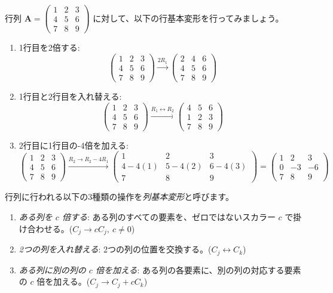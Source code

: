 \begin{ex}
行列 $\bm{A} = \begin{pmatrix} 1 & 2 & 3 \\ 4 & 5 & 6 \\ 7 & 8 & 9 \end{pmatrix}$ に対して、以下の行基本変形を行ってみましょう。
\begin{enumerate}
    \item 1行目を2倍する:
    \[ \begin{pmatrix} 1 & 2 & 3 \\ 4 & 5 & 6 \\ 7 & 8 & 9 \end{pmatrix} \xrightarrow{2R_1} \begin{pmatrix} 2 & 4 & 6 \\ 4 & 5 & 6 \\ 7 & 8 & 9 \end{pmatrix} \]
    \item 1行目と2行目を入れ替える:
    \[ \begin{pmatrix} 1 & 2 & 3 \\ 4 & 5 & 6 \\ 7 & 8 & 9 \end{pmatrix} \xrightarrow{R_1 \leftrightarrow R_2} \begin{pmatrix} 4 & 5 & 6 \\ 1 & 2 & 3 \\ 7 & 8 & 9 \end{pmatrix} \]
    \item 2行目に1行目の-4倍を加える:
    \[ \begin{pmatrix} 1 & 2 & 3 \\ 4 & 5 & 6 \\ 7 & 8 & 9 \end{pmatrix} \xrightarrow{R_2 \to R_2 - 4R_1} \begin{pmatrix} 1 & 2 & 3 \\ 4-4(1) & 5-4(2) & 6-4(3) \\ 7 & 8 & 9 \end{pmatrix} = \begin{pmatrix} 1 & 2 & 3 \\ 0 & -3 & -6 \\ 7 & 8 & 9 \end{pmatrix} \]
\end{enumerate}
\end{ex}

\begin{dfn}[列基本変形]
行列に行われる以下の3種類の操作を\emph{列基本変形}と呼びます。
\begin{enumerate}
    \item \emph{ある列を $c$ 倍する}: ある列のすべての要素を、ゼロではないスカラー $c$ で掛け合わせる。($C_j \to cC_j,\ c \neq 0$)
    \item \emph{2つの列を入れ替える}: 2つの列の位置を交換する。($C_j \leftrightarrow C_k$)
    \item \emph{ある列に別の列の $c$ 倍を加える}: ある列の各要素に、別の列の対応する要素の $c$ 倍を加える。($C_j \to C_j + cC_k$)
\end{enumerate}
\end{dfn}

